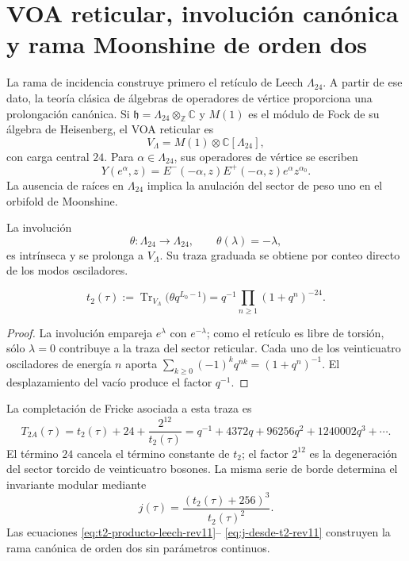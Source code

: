 \section{VOA reticular, involución canónica y rama Moonshine de orden dos}
\label{sec:voa-moonshine-orden-dos-rev11}

La rama de incidencia construye primero el retículo de Leech
\(\Lambda_{24}\). A partir de ese dato, la teoría clásica de álgebras de
operadores de vértice proporciona una prolongación canónica. Si
\(\mathfrak h=\Lambda_{24}\otimes_{\mathbb Z}\mathbb C\) y \(M(1)\) es
el módulo de Fock de su álgebra de Heisenberg, el VOA reticular es
\begin{equation}
 V_{\Lambda}=M(1)\otimes\mathbb C[\Lambda_{24}],
 \label{eq:voa-reticular-leech-rev11}
\end{equation}
con carga central \(24\). Para \(\alpha\in\Lambda_{24}\), sus operadores
de vértice se escriben
\[
 Y(e^\alpha,z)=E^-(-\alpha,z)E^+(-\alpha,z)e^\alpha z^{\alpha_0}.
\]
La ausencia de raíces en \(\Lambda_{24}\) implica la anulación del sector
de peso uno en el orbifold de Moonshine.

La involución
\[
 \theta:\Lambda_{24}\longrightarrow\Lambda_{24},
 \qquad \theta(\lambda)=-\lambda,
\]
es intrínseca y se prolonga a \(V_{\Lambda}\). Su traza graduada se obtiene
por conteo directo de los modos osciladores.

\begin{theorem}
\label{thm:traza-theta-leech-rev11}
\begin{equation}
 t_2(\tau)
 :=\operatorname{Tr}_{V_\Lambda}
 \bigl(\theta q^{L_0-1}\bigr)
 =q^{-1}\prod_{n\geq1}(1+q^n)^{-24}.
 \label{eq:t2-producto-leech-rev11}
\end{equation}
\end{theorem}
\begin{proof}
La involución empareja \(e^\lambda\) con \(e^{-\lambda}\); como el retículo
es libre de torsión, sólo \(\lambda=0\) contribuye a la traza del sector
reticular. Cada uno de los veinticuatro osciladores de energía \(n\) aporta
\(\sum_{k\geq0}(-1)^kq^{nk}=(1+q^n)^{-1}\). El desplazamiento del vacío
produce el factor \(q^{-1}\).
\end{proof}

La completación de Fricke asociada a esta traza es
\begin{equation}
 T_{2A}(\tau)=t_2(\tau)+24+\frac{2^{12}}{t_2(\tau)}
 =q^{-1}+4372q+96256q^2+1240002q^3+\cdots.
 \label{eq:T2A-hmt-rev11}
\end{equation}
El término \(24\) cancela el término constante de \(t_2\); el factor
\(2^{12}\) es la degeneración del sector torcido de veinticuatro bosones.
La misma serie de borde determina el invariante modular mediante
\begin{equation}
 \boxed{j(\tau)=\frac{(t_2(\tau)+256)^3}{t_2(\tau)^2}}.
 \label{eq:j-desde-t2-rev11}
\end{equation}
Las ecuaciones \eqref{eq:t2-producto-leech-rev11}--
\eqref{eq:j-desde-t2-rev11} construyen la rama canónica de orden dos sin
parámetros continuos.

